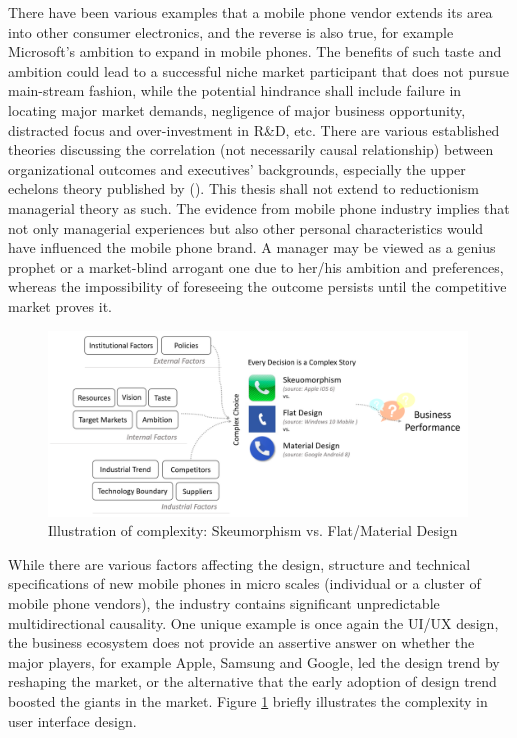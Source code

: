 \documentclass[utf8,english]{gradu3}
\begin{document}
There have been various examples that a mobile phone vendor extends its area into other consumer electronics, and the reverse is also true, for example Microsoft's ambition to expand in mobile phones. The benefits of such taste and ambition could lead to a successful niche market participant that does not pursue main-stream fashion, while the potential hindrance shall include failure in locating major market demands, negligence of major business opportunity, distracted focus and over-investment in R\&D, etc. There are various established theories discussing the correlation (not necessarily causal relationship) between organizational outcomes and executives' backgrounds, especially the upper echelons theory published by \citeauthor{hambrick1984upper} (\citeyear{hambrick1984upper}). This thesis shall not extend to reductionism managerial theory as such. The evidence from mobile phone industry implies that not only managerial experiences but also other personal characteristics would have influenced the mobile phone brand. A manager may be viewed as a genius prophet or a market-blind arrogant one due to her/his ambition and preferences, whereas the impossibility of foreseeing the outcome persists until the competitive market proves it.

\begin{figure}[htb]
    \centering
    \includegraphics[width=0.99\textwidth]{design.png}
    \caption{Illustration of complexity: Skeumorphism vs. Flat/Material Design}
    \label{fig:design}
\end{figure}

While there are various factors affecting the design, structure and technical specifications of new mobile phones in micro scales (individual or a cluster of mobile phone vendors), the industry contains significant unpredictable multidirectional causality. One unique example is once again the UI/UX design, the business ecosystem does not provide an assertive answer on whether the major players, for example Apple, Samsung and Google, led the design trend by reshaping the market, or the alternative that the early adoption of design trend boosted the giants in the market. Figure \ref{fig:design} briefly illustrates the complexity in user interface design.
\end{document}
